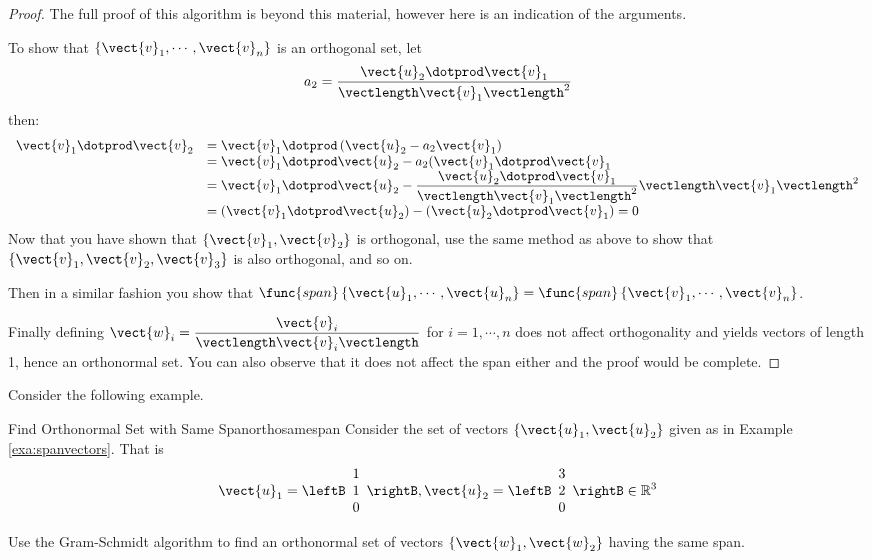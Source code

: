 \begin{proof}
The full proof of this algorithm is beyond this material, however here is an indication of the arguments. 

To show that  $\left\{ \vect{v}_1,\cdots , \vect{v}_n  \right\} $ is an orthogonal set, let 
\[ a_2 =  \dfrac{ \vect{u}_2 \dotprod \vect{v}_1}{\vectlength \vect{v}_1 \vectlength^2} \]
then: 
\[
\begin{array}{ll}
 \vect{v}_1 \dotprod \vect{v}_2 &  =  \vect{v}_1 \dotprod \left( \vect{u}_2 - a_2 \vect{v}_1 \right)  \\
 & = \vect{v}_1 \dotprod \vect{u}_2 - a_2 (\vect{v}_1 \dotprod \vect{v}_1  \\
 & = \vect{v}_1 \dotprod \vect{u}_2 - \dfrac{ \vect{u}_2 \dotprod \vect{v}_1}{\vectlength \vect{v}_1 \vectlength^2} \vectlength \vect{v}_1 \vectlength^2 \\
 & = ( \vect{v}_1 \dotprod \vect{u}_2 ) - ( \vect{u}_2 \dotprod \vect{v}_1 ) =0\\
\end{array}
\]
Now that you have shown that $\{ \vect{v}_1, \vect{v}_2\}$ is orthogonal,  use the same method as above to show that 
$\{ \vect{v}_1, \vect{v}_2, \vect{v}_3\}$ is also orthogonal,  and so on. 

Then in a similar fashion you show that $\func{span}\left\{
\vect{u}_1,\cdots ,\vect{u}_n \right\} = \func{span}\left\{
\vect{v}_1,\cdots ,\vect{v}_n \right\}$.

Finally defining $\vect{w}_i =
\dfrac{\vect{v}_i}{\vectlength\vect{v}_i\vectlength}$ for $i=1, \cdots
,n$ does not affect orthogonality and yields vectors of length 1,
hence an orthonormal set. You can also observe that it does not affect
the span either and the proof would be complete.
\end{proof}

Consider the following example.

\begin{example}{Find Orthonormal Set with Same Span}{orthosamespan}
Consider the set of vectors $\{\vect{u}_1, \vect{u}_2\}$ given as in Example \ref{exa:spanvectors}. That is  
\[
\vect{u}_1=\leftB 
\begin{array}{r}
1 \\
1 \\
0
\end{array}
\rightB, \vect{u}_2=\leftB 
\begin{array}{r}
3 \\
2 \\
0
\end{array}
\rightB \in \mathbb{R}^{3} 
\]

Use the Gram-Schmidt algorithm to find an orthonormal set of vectors $\{\vect{w}_1, \vect{w}_2\}$ having the same span.
\end{example}

